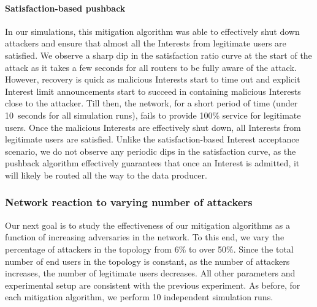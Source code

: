 \documentclass[10pt,conference]{IEEEtran}
\begin{document}
{\paragraph{\textbf{Satisfaction-based pushback}}

In our simulations, this mitigation algorithm was able to effectively shut down attackers and ensure that almost all the Interests from legitimate users are satisfied. 
We observe a  sharp dip in the satisfaction ratio curve at the start of the attack as it takes a few seconds for all routers to be fully aware of the attack. However, recovery is quick as malicious Interests start to time out and explicit Interest limit announcements start to succeed in containing malicious Interests close to the attacker. Till then, the network, for a short period of time (under 10~seconds for all simulation runs), fails to provide 100\% service for legitimate users. Once the malicious Interests are effectively shut down, all Interests from legitimate users are satisfied. Unlike the satisfaction-based Interest acceptance scenario, we do not observe any periodic dips in the satisfaction curve, as the pushback algorithm effectively guarantees that once an Interest is admitted, it will likely be routed all the way to the data producer.

\subsubsection{Network reaction to varying number of attackers}

Our next goal is to study the effectiveness of our mitigation algorithms as a function of increasing adversaries in the network.
To this end, we vary the percentage of attackers in the topology from 6\% to over 50\%. Since the total number of end users in the topology is constant, as the number of attackers increases, the number of legitimate users decreases. All other parameters and experimental setup are consistent with the previous experiment. As before, for each mitigation algorithm, we perform 10 independent simulation runs.

}
\end{document}

